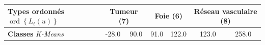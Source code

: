 	\begin{center}
		\begin{tabular}{|l|cccccc|}
			\hline
			 	\textbf{Types ordonnés} $\operatorname{ord} \left\{ L_t(u) \right\}$	& \multicolumn{2}{|c|}{Tumeur (7)} 	& \multicolumn{2}{|c|}{Foie (6)} 	& \multicolumn{2}{|c|}{Réseau vasculaire (8)}  		 \\
			 \hline
			 	\textbf{Classes} \emph{K-Means}	& -28.0 & 90.0 & 91.0 & 122.0 & 123.0 & 258.0 		 \\
			 \hline	
		\end{tabular}
		\label{tab:labeling}
	\end{center}



%	
%	

